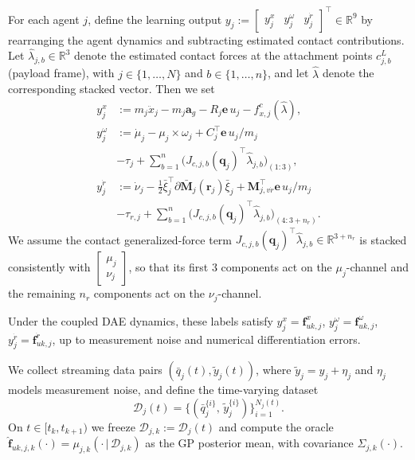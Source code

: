 \documentclass[letterpaper, 10 pt, conference]{ieeeconf}  %
\newcommand{\0}{\matr{0}}
\begin{document}
For each agent $j$, define the learning output
$y_j :=
\begin{bmatrix}
y^{x}_j &
y^{\omega}_j &
y^{\dot r}_j
\end{bmatrix}^{\top}
\in\mathbb R^9$ by rearranging the agent dynamics and subtracting estimated contact contributions.
Let $\hat\lambda_{j,b}\in\mathbb R^3$ denote the estimated contact forces at the attachment points $c^L_{j,b}$ (payload frame),
with $j\in\{1,\dots,N\}$ and $b\in\{1,\dots,n\}$, and let $\hat\lambda$ denote the corresponding stacked vector.
Then we set
\begin{align}
y^{x}_j &:= m_j\ddot{x}_j - m_j\mathbf a_g - R_j\mathbf e\, u_j - f^{c}_{x,j}(\hat\lambda), \nonumber\\
y^{\omega}_j &:= \dot\mu_j - \mu_j\times\omega_j
+ C_j^{\top}\mathbf e\, u_j/m_j \\&- \tau_j
+ \sum_{b=1}^{n} \big(J_{c,j,b}(\mathbf q_j)^\top \hat\lambda_{j,b}\big)_{(1:3)}, \nonumber\\
y^{\dot r}_j &:= \dot\nu_j
- \tfrac12 \bar\xi_j^{\top}\partial\bar{\mathbf M}_j(\mathbf r_j)\bar\xi_j
+ \mathbf M_{j,v\dot{r}}^{\top}\mathbf e\, u_j/m_j \\&- \tau_{r,j}
+ \sum_{b=1}^{n} \big(J_{c,j,b}(\mathbf q_j)^\top \hat\lambda_{j,b}\big)_{(4:3+n_r)}.
\label{eq:learning_output_components}
\end{align}
We assume the contact generalized-force term $J_{c,j,b}(\mathbf q_j)^\top\hat\lambda_{j,b}\in\mathbb R^{3+n_r}$ is stacked consistently
with $\begin{bmatrix}\mu_j\\ \nu_j\end{bmatrix}$, so that its first $3$ components act on the $\mu_j$-channel and the remaining $n_r$
components act on the $\nu_j$-channel.

Under the coupled DAE dynamics, these labels satisfy
$y^{x}_j=\mathbf f_{uk,j}^{x}$,
$y^{\omega}_j=\mathbf f_{uk,j}^{\omega}$,
$y^{\dot r}_j=\mathbf f_{uk,j}^{\dot r}$,
up to measurement noise and numerical differentiation errors.

We collect streaming data pairs $(\bar q_j(t),\tilde y_j(t))$, where $\tilde y_j=y_j+\eta_j$ and $\eta_j$ models measurement noise, and define
the time-varying dataset
\begin{equation}
\mathcal D_j(t)=\{(\bar q_j^{\{i\}},\,\tilde y_j^{\{i\}})\}_{i=1}^{N_j(t)}.
\label{eq:dataset_agent_online}
\end{equation}
On $t\in[t_k,t_{k+1})$ we freeze $\mathcal D_{j,k}:=\mathcal D_j(t)$ and compute the oracle
$\hat{\mathbf f}_{uk,j,k}(\cdot)=\mu_{j,k}(\cdot\,|\,\mathcal D_{j,k})$ as the GP posterior mean, with covariance $\Sigma_{j,k}(\cdot)$.
\end{document}
